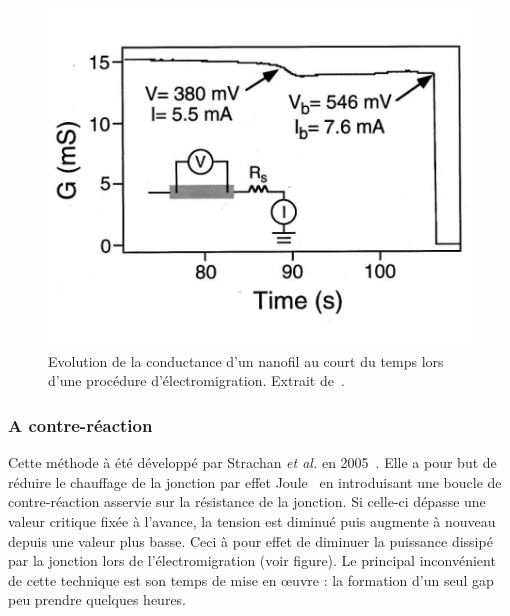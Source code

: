 \begin{figure}
\parbox{7cm}{
\includegraphics[scale=0.45]{Fabrication/ElecMigExemp/ParkFig.pdf} 
}
\parbox{5cm}{\caption{Evolution de la conductance d'un nanofil au court du temps lors d'une procédure d'électromigration. Extrait de~\cite{Park1999}.}
\label{ParkExemp}
}
\end{figure}



\subsubsection{A contre-réaction}
Cette méthode à été développé par Strachan \textit{et al.} en 2005~\cite{Strachan2005}. Elle a pour but de réduire le chauffage de la jonction par effet Joule~\cite{Esen2005} en introduisant une boucle de contre-réaction asservie sur la résistance de la jonction. Si celle-ci dépasse une valeur critique fixée à l'avance, la tension est diminué puis augmente à nouveau depuis une valeur plus basse. Ceci à pour effet de diminuer la puissance dissipé par la jonction lors de l'électromigration (voir figure). Le principal inconvénient de cette technique est son temps de mise en œuvre : la formation d'un seul gap peu prendre quelques heures.


